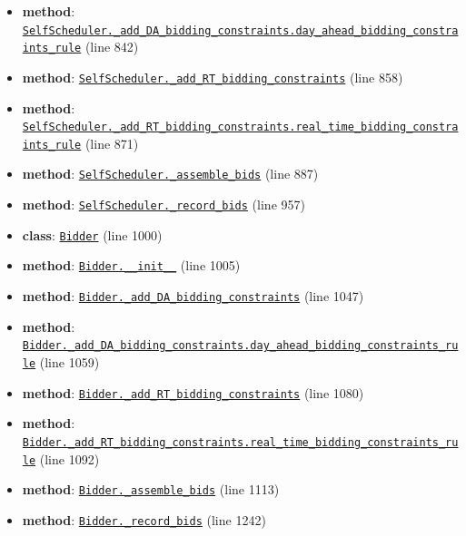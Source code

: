 \documentclass[11pt]{report}
\begin{document}
\begin{itemize}[leftmargin=*]
  \item \textbf{method}: \hyperref[def:bidder.py:SelfScheduler._add_DA_bidding_constraints.day_ahead_bidding_constraints_rule:L842]{\texttt{SelfScheduler.\_add\_DA\_bidding\_constraints.day\_ahead\_bidding\_constraints\_rule}} (line 842)
  \item \textbf{method}: \hyperref[def:bidder.py:SelfScheduler._add_RT_bidding_constraints:L858]{\texttt{SelfScheduler.\_add\_RT\_bidding\_constraints}} (line 858)
  \item \textbf{method}: \hyperref[def:bidder.py:SelfScheduler._add_RT_bidding_constraints.real_time_bidding_constraints_rule:L871]{\texttt{SelfScheduler.\_add\_RT\_bidding\_constraints.real\_time\_bidding\_constraints\_rule}} (line 871)
  \item \textbf{method}: \hyperref[def:bidder.py:SelfScheduler._assemble_bids:L887]{\texttt{SelfScheduler.\_assemble\_bids}} (line 887)
  \item \textbf{method}: \hyperref[def:bidder.py:SelfScheduler._record_bids:L957]{\texttt{SelfScheduler.\_record\_bids}} (line 957)
  \item \textbf{class}: \hyperref[def:bidder.py:Bidder:L1000]{\texttt{Bidder}} (line 1000)
  \item \textbf{method}: \hyperref[def:bidder.py:Bidder.__init__:L1005]{\texttt{Bidder.\_\_init\_\_}} (line 1005)
  \item \textbf{method}: \hyperref[def:bidder.py:Bidder._add_DA_bidding_constraints:L1047]{\texttt{Bidder.\_add\_DA\_bidding\_constraints}} (line 1047)
  \item \textbf{method}: \hyperref[def:bidder.py:Bidder._add_DA_bidding_constraints.day_ahead_bidding_constraints_rule:L1059]{\texttt{Bidder.\_add\_DA\_bidding\_constraints.day\_ahead\_bidding\_constraints\_rule}} (line 1059)
  \item \textbf{method}: \hyperref[def:bidder.py:Bidder._add_RT_bidding_constraints:L1080]{\texttt{Bidder.\_add\_RT\_bidding\_constraints}} (line 1080)
  \item \textbf{method}: \hyperref[def:bidder.py:Bidder._add_RT_bidding_constraints.real_time_bidding_constraints_rule:L1092]{\texttt{Bidder.\_add\_RT\_bidding\_constraints.real\_time\_bidding\_constraints\_rule}} (line 1092)
  \item \textbf{method}: \hyperref[def:bidder.py:Bidder._assemble_bids:L1113]{\texttt{Bidder.\_assemble\_bids}} (line 1113)
  \item \textbf{method}: \hyperref[def:bidder.py:Bidder._record_bids:L1242]{\texttt{Bidder.\_record\_bids}} (line 1242)

\end{itemize}
\end{document}
